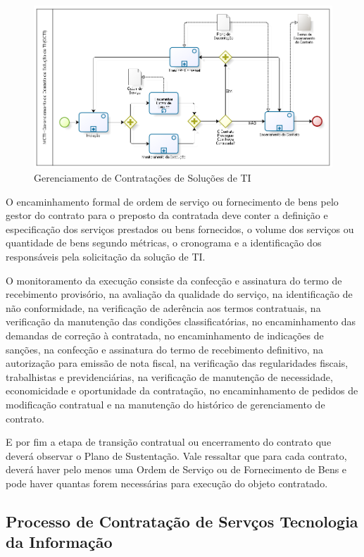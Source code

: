 \begin{figure}[h]
		\centering
		\label{fig05}
			\includegraphics[scale=0.6]{figuras/GCTI.png}
		\caption{Gerenciamento de Contratações de Soluções de TI}
\end{figure}

O encaminhamento formal de ordem de serviço ou fornecimento de bens pelo gestor do contrato para o preposto da contratada deve conter a definição e especificação dos serviços prestados ou bens fornecidos, o volume dos serviços ou quantidade de bens segundo métricas, o cronograma e a identificação dos responsáveis pela solicitação da solução de TI. 

O monitoramento da execução consiste da confecção e assinatura do termo de recebimento provisório, na avaliação da qualidade do serviço, na identificação de não conformidade, na verificação de aderência aos termos contratuais, na verificação da manutenção das condições classificatórias, no encaminhamento das demandas de correção à contratada, no encaminhamento de indicações de sanções, na confecção e assinatura do termo de recebimento definitivo, na autorização para emissão de nota fiscal, na verificação das regularidades fiscais, trabalhistas e previdenciárias, na verificação de manutenção de necessidade, economicidade e oportunidade da contratação, no encaminhamento de pedidos de modificação contratual e na manutenção do histórico de gerenciamento de contrato. 

E por fim a etapa de transição contratual ou encerramento do contrato que deverá observar o Plano de Sustentação. Vale ressaltar que para cada contrato, deverá haver pelo menos uma Ordem de Serviço ou de Fornecimento de Bens e pode haver quantas forem necessárias para execução do objeto contratado.


\subsection[Processo de Contratação de Serviços Tecnologia da Informação]{Processo de Contratação de Servços Tecnologia da Informação}

